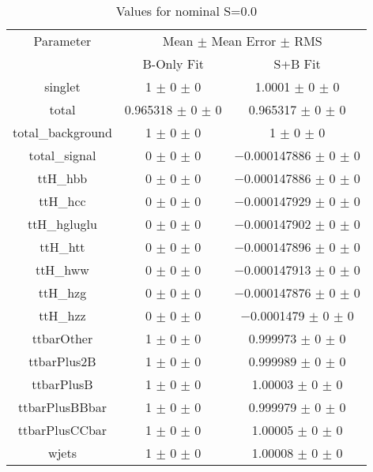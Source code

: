 \begin{table}
\centering
\caption{Values for nominal S=0.0}
\begin{tabular}{ccc}
\toprule
Parameter & \multicolumn{2}{c}{Mean $\pm$ Mean Error $\pm$ RMS}\\
 & B-Only Fit & S+B Fit\\
\midrule
singlet & \num{1} $\pm$ \num{0} $\pm$ \num{0} & \num{1.0001} $\pm$ \num{0} $\pm$ \num{0}\\
total & \num{0.965318} $\pm$ \num{0} $\pm$ \num{0} & \num{0.965317} $\pm$ \num{0} $\pm$ \num{0}\\
total\_background & \num{1} $\pm$ \num{0} $\pm$ \num{0} & \num{1} $\pm$ \num{0} $\pm$ \num{0}\\
total\_signal & \num{0} $\pm$ \num{0} $\pm$ \num{0} & \num{-0.000147886} $\pm$ \num{0} $\pm$ \num{0}\\
ttH\_hbb & \num{0} $\pm$ \num{0} $\pm$ \num{0} & \num{-0.000147886} $\pm$ \num{0} $\pm$ \num{0}\\
ttH\_hcc & \num{0} $\pm$ \num{0} $\pm$ \num{0} & \num{-0.000147929} $\pm$ \num{0} $\pm$ \num{0}\\
ttH\_hgluglu & \num{0} $\pm$ \num{0} $\pm$ \num{0} & \num{-0.000147902} $\pm$ \num{0} $\pm$ \num{0}\\
ttH\_htt & \num{0} $\pm$ \num{0} $\pm$ \num{0} & \num{-0.000147896} $\pm$ \num{0} $\pm$ \num{0}\\
ttH\_hww & \num{0} $\pm$ \num{0} $\pm$ \num{0} & \num{-0.000147913} $\pm$ \num{0} $\pm$ \num{0}\\
ttH\_hzg & \num{0} $\pm$ \num{0} $\pm$ \num{0} & \num{-0.000147876} $\pm$ \num{0} $\pm$ \num{0}\\
ttH\_hzz & \num{0} $\pm$ \num{0} $\pm$ \num{0} & \num{-0.0001479} $\pm$ \num{0} $\pm$ \num{0}\\
ttbarOther & \num{1} $\pm$ \num{0} $\pm$ \num{0} & \num{0.999973} $\pm$ \num{0} $\pm$ \num{0}\\
ttbarPlus2B & \num{1} $\pm$ \num{0} $\pm$ \num{0} & \num{0.999989} $\pm$ \num{0} $\pm$ \num{0}\\
ttbarPlusB & \num{1} $\pm$ \num{0} $\pm$ \num{0} & \num{1.00003} $\pm$ \num{0} $\pm$ \num{0}\\
ttbarPlusBBbar & \num{1} $\pm$ \num{0} $\pm$ \num{0} & \num{0.999979} $\pm$ \num{0} $\pm$ \num{0}\\
ttbarPlusCCbar & \num{1} $\pm$ \num{0} $\pm$ \num{0} & \num{1.00005} $\pm$ \num{0} $\pm$ \num{0}\\
wjets & \num{1} $\pm$ \num{0} $\pm$ \num{0} & \num{1.00008} $\pm$ \num{0} $\pm$ \num{0}\\
\bottomrule
\end{tabular}
\end{table}